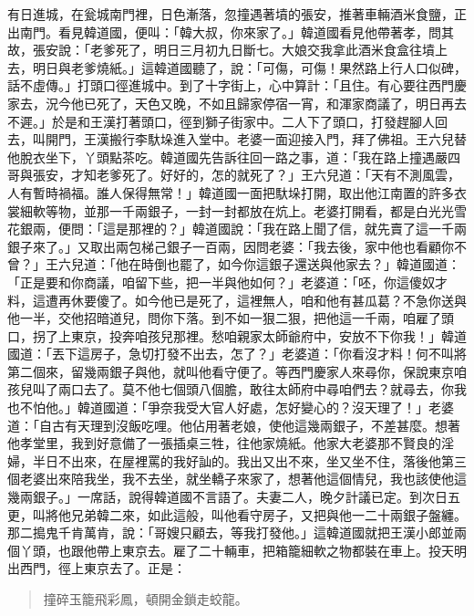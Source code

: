 有日進城，在瓮城南門裡，日色漸落，忽撞遇著墳的張安，推著車輛酒米食鹽，正出南門。看見韓道國，便叫：「韓大叔，你來家了。」韓道國看見他帶著孝，問其故，張安說：「老爹死了，明日三月初九日斷七。大娘交我拿此酒米食盒往墳上去，明日與老爹燒紙。」這韓道國聽了，說：「可傷，可傷！果然路上行人口似碑，話不虛傳。」打頭口徑進城中。到了十字街上，心中算計：「且住。有心要往西門慶家去，況今他已死了，天色又晚，不如且歸家停宿一宵，和渾家商議了，明日再去不遲。」於是和王漢打著頭口，徑到獅子街家中。二人下了頭口，打發趕腳人回去，叫開門，王漢搬行李馱垛進入堂中。老婆一面迎接入門，拜了佛祖。王六兒替他脫衣坐下，丫頭點茶吃。韓道國先告訴往回一路之事，道：「我在路上撞遇嚴四哥與張安，才知老爹死了。好好的，怎的就死了？」王六兒道：「天有不測風雲，人有暫時禍福。誰人保得無常！」韓道國一面把馱垛打開，取出他江南置的許多衣裳細軟等物，並那一千兩銀子，一封一封都放在炕上。老婆打開看，都是白光光雪花銀兩，便問：「這是那裡的？」韓道國說：「我在路上聞了信，就先賣了這一千兩銀子來了。」又取出兩包梯己銀子一百兩，因問老婆：「我去後，家中他也看顧你不曾？」王六兒道：「他在時倒也罷了，如今你這銀子還送與他家去？」韓道國道：「正是要和你商議，咱留下些，把一半與他如何？」老婆道：「呸，你這傻奴才料，這遭再休要傻了。如今他已是死了，這裡無人，咱和他有甚瓜葛？不急你送與他一半，交他招暗道兒，問你下落。到不如一狠二狠，把他這一千兩，咱雇了頭口，拐了上東京，投奔咱孩兒那裡。愁咱親家太師爺府中，安放不下你我！」韓道國道：「丟下這房子，急切打發不出去，怎了？」老婆道：「你看沒才料！何不叫將第二個來，留幾兩銀子與他，就叫他看守便了。等西門慶家人來尋你，保說東京咱孩兒叫了兩口去了。莫不他七個頭八個膽，敢往太師府中尋咱們去？就尋去，你我也不怕他。」韓道國道：「爭奈我受大官人好處，怎好變心的？沒天理了！」老婆道：「自古有天理到沒飯吃哩。他佔用著老娘，使他這幾兩銀子，不差甚麼。想著他孝堂里，我到好意備了一張插桌三牲，往他家燒紙。他家大老婆那不賢良的淫婦，半日不出來，在屋裡罵的我好訕的。我出又出不來，坐又坐不住，落後他第三個老婆出來陪我坐，我不去坐，就坐轎子來家了，想著他這個情兒，我也該使他這幾兩銀子。」一席話，說得韓道國不言語了。夫妻二人，晚夕計議已定。到次日五更，叫將他兄弟韓二來，如此這般，叫他看守房子，又把與他一二十兩銀子盤纏。那二搗鬼千肯萬肯，說：「哥嫂只顧去，等我打發他。」這韓道國就把王漢小郎並兩個丫頭，也跟他帶上東京去。雇了二十輛車，把箱籠細軟之物都裝在車上。投天明出西門，徑上東京去了。正是：
\begin{quote}
撞碎玉籠飛彩鳳，頓開金鎖走蛟龍。
\end{quote}

